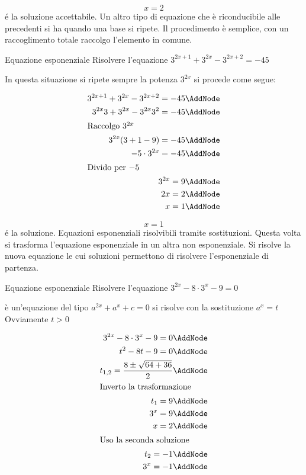 	\[x=2\]
	\'{e} la soluzione accettabile.
Un altro tipo di equazione che è riconducibile alle precedenti si ha quando una base si ripete. Il procedimento è semplice, con un raccoglimento totale raccolgo l'elemento in comune. 
\begin{esempiot}{Equazione esponenziale}{}
	Risolvere l'equazione $3^{2x+1}+3^{2x}-3^{2x+2}=-45$
\end{esempiot}
	In questa situazione si ripete sempre la potenza $3^{2x}$  si procede come segue:\newpage
	\begin{NodesList}%
		\begin{align*}
			3^{2x+1}+3^{2x}-3^{2x+2}=-45\AddNode\\
			3^{2x}3+3^{2x}-3^{2x}3^2=-45\AddNode\\
			\intertext{\hfil Raccolgo $3^{2x}$}
			3^{2x}(3+1-9)=-45\AddNode\\
			-5\cdot 3^{2x}=-45\AddNode\\
			\intertext{\hfil Divido per $-5$}
			3^{2x}=9\AddNode\\
			2x=2\AddNode\\
			x=1\AddNode\\
		\end{align*}
	\end{NodesList}
	\[x=1\]
	\'{e} la soluzione.
Equazioni esponenziali risolvibili tramite sostituzioni. Questa volta si trasforma l'equazione esponenziale in un altra non esponenziale. Si risolve la nuova equazione le cui soluzioni permettono di risolvere l'esponenziale di partenza.
\begin{esempiot}{Equazione esponenziale}{}
	Risolvere l'equazione $3^{2x}-8\cdot 3^x-9=0$
\end{esempiot}
	 è un'equazione del tipo $a^{2x}+a^{x}+c=0$ si risolve con la sostituzione $a^{x}=t$ Ovviamente $t>0$ 
	\begin{NodesList} %
		\begin{align*}
			3^{2x}-8\cdot 3^x-9=0\AddNode\\
			t^2-8t-9=0\AddNode\\
			t_{1,2}=\dfrac{8\pm\sqrt{64+36}}{2}\AddNode\\
			\intertext{\hfil Inverto la trasformazione}
			t_{1}=9\AddNode\\
			3^{x}=9\AddNode\\
			x=2\AddNode\\
			\intertext{\hfil Uso la seconda soluzione}
			t_{2}=-1\AddNode\\
			3^x=-1\AddNode
		\end{align*}
		\LinkNodes{}%
	\end{NodesList}
